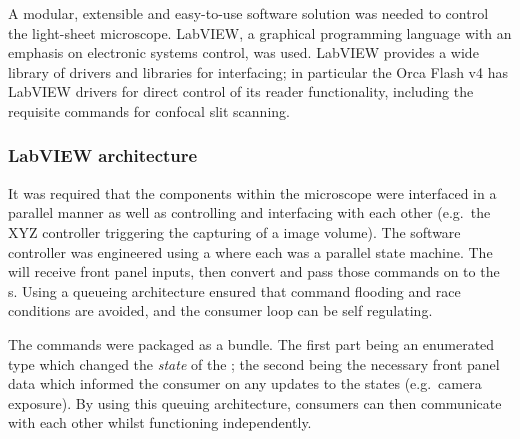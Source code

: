 A modular, extensible and easy-to-use software solution was needed to control the \gls{light-sheet} microscope.
\gls{LabVIEW}, a graphical programming language with an emphasis on electronic systems control, was used.
\gls{LabVIEW} provides a wide library of drivers and libraries for interfacing; in particular the Orca Flash v4 has \gls{LabVIEW} drivers for direct control of its reader functionality, including the requisite commands for confocal slit scanning.

\subsubsection{\gls{LabVIEW} architecture}


It was required that the components within the microscope were interfaced in a parallel manner as well as controlling and interfacing with each other (e.g.~the XYZ controller triggering the capturing of a image volume).
The software controller was engineered using a  where each  was a parallel \gls{state machine}.
The  will receive front panel inputs, then convert and pass those commands on to the s.
Using a \gls{queueing architecture} ensured that command flooding and \gls{race conditions} are avoided, and the consumer loop can be self regulating.

The commands were packaged as a bundle.
The first part being an enumerated type which changed the \emph{state} of the ; the second being the necessary front panel data which informed the consumer on any updates to the states (e.g.~camera exposure).
By using this queuing architecture, consumers can then communicate with each other whilst functioning independently.

